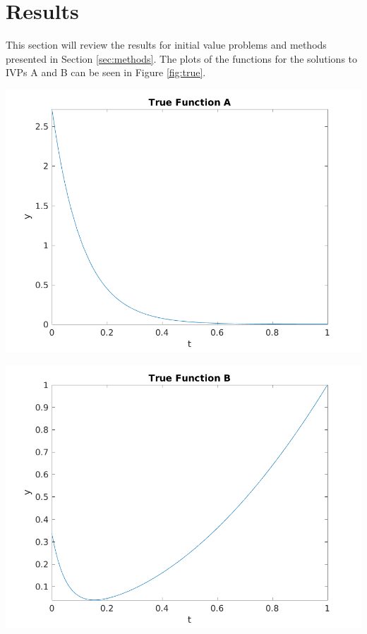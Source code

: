 \documentclass{article}
\begin{document}
\newpage
\section{Results}
\label{sec:results}




This section will review the results for initial value problems and methods presented in Section \ref{sec:methods}. The plots of the functions for the solutions to IVPs A and B can be seen in Figure \ref{fig:true}.

\begin{center}
	\centering
    \begin{minipage}{0.5\textwidth}
        \centering
	    \includegraphics[width=1.1\textwidth]{../output/a_actual.png}
    \end{minipage}\hfill
    \begin{minipage}{0.5\textwidth}
        \centering
	    \includegraphics[width=1.1\textwidth]{../output/b_actual.png}
    \end{minipage}
 	\label{fig:true}
\end{center}
\end{document}
